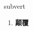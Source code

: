 
\begin{frame}
{\huge subvert}
\begin{center}
\begin{enumerate}\Large
  \item \textbf{颠覆}
\end{enumerate}
\end{center}
\end{frame}
